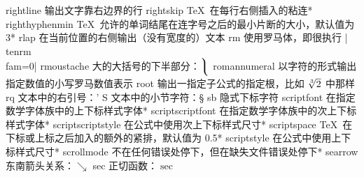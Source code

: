 \capcs rightline {输出文字靠右边界的行}{}{}
\capcs rightskip {\TeX\ 在每行右侧插入的粘连}*{}
\capcs righthyphenmin {\TeX\ 允许的单词结尾在连字号之后的最小片断的大小，默认值为 3}*{}
\capcs rlap {在当前位置的右侧输出（没有宽度的）文本}{}{}
\capcs rm {使用罗马体，即很执行 |\\tenrm\\fam=0|}{}{}
\capcs rmoustache {大的大括号的下半部分：$\big\rmoustache$}{}{}
\capcs romannumeral {以字符的形式输出指定数值的小写罗马数值表示}{}{}
\capcs root {输出一指定子公式的指定根，比如 $\root 3 \of 2$ 中那样}{}{}
\capcs rq {文本中的右引号：\rq}{}{}
\capcs S {文本中的小节字符：\S}{}{}
\capcs sb {隐式下标字符}{}{}
\capcs scriptfont {在指定数学字体族中的上下标样式字体}*{}
\capcs scriptscriptfont {在指定数学字体族中的次上下标样式字体}*{}
\capcs scriptscriptstyle {在公式中使用次上下标样式尺寸}*{}
\capcs scriptspace {\TeX\ 在下标或上标之后加入的额外的紧排，默认值为 0.5\pt}*{}
\capcs scriptstyle {在公式中使用上下标样式尺寸}*{}
\capcs scrollmode {不在任何错误处停下，但在缺失文件错误处停下}*{}
\capcs searrow {东南箭头关系：$\searrow$}{}{}
\capcs sec {正切函数：$\sec$}{}{}
